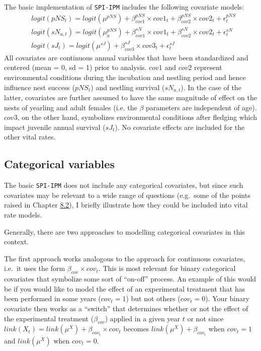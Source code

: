 \documentclass[
]{book}
\begin{document}
The basic implementation of \texttt{SPI-IPM} includes the following covariate models:
\begin{align*}
  & logit(pNS_t) = logit(\mu^{pNS}) + \beta_{cov1}^{pNS}\times cov1_t + \beta_{cov2}^{pNS} \times cov2_t + \epsilon_t^{pNS} \\
  & logit(sN_{a,t}) = logit(\mu_a^{pNS}) + \beta_{cov1}^{sN}\times cov1_t + \beta_{cov2}^{sN} \times cov2_t + \epsilon_t^{sN} \\
  & logit(sJ_t) = logit(\mu^{sJ}) + \beta_{cov3}^{sJ}\times cov3_t + \epsilon_t^{sJ}
\end{align*}
All covariates are continuous annual variables that have been standardized and
centered (mean = 0, sd = 1) prior to analysis.
\(cov1\) and \(cov2\) represent environmental conditions during the incubation and
nestling period and hence influence nest success (\(pNS_t\)) and nestling survival
(\(sN_{a,t}\)). In the case of the latter, covariates are further assumed to have
the same magnitude of effect on the nests of yearling and adult females (i.e.
the \(\beta\) parameters are independent of age). \(cov3\), on the other hand,
symbolizes environmental conditions after fledging which impact juvenile annual
survival (\(sJ_t\)). No covariate effects are included for the other vital rates.

\hypertarget{categorical-variables}{%
\subsection{Categorical variables}\label{categorical-variables}}

The basic \texttt{SPI-IPM} does not include any categorical covariates, but since such
covariates may be relevant to a wide range of questions (e.g.~some of the points
raised in Chapter \protect\hyperlink{ux5cux23ux5cux2520Adaptingux5cux2520theux5cux2520populationux5cux2520modelux5cux2520forux5cux2520yourux5cux2520speciesux2fpopulation}{8.2}),
I briefly illustrate how they could be included into vital rate models.

Generally, there are two approaches to modelling categorical covariates in this
context.

The first approach works analogous to the approach for continuous covariates,
i.e.~it uses the form \(\beta_{cov}\times cov_t\). This is most relevant for
binary categorical covariates that symbolize some sort of ``on-off'' process. An
example of this would be if you would like to model the effect of an experimental
treatment that has been performed in some years (\(cov_t = 1\)) but not others
(\(cov_t = 0\)). Your binary covariate then works as a ``switch'' that determines
whether or not the effect of the experimental treatment (\(\beta_{cov}\)) applied
in a given year \(t\) or not since \(link(X_t) = link(\mu^X) + \beta_{cov_t}\times cov_t\) becomes \(link(\mu^X) + \beta_{cov_t}\) when \(cov_t = 1\) and \(link(\mu^X)\)
when \(cov_t = 0\).
\end{document}
